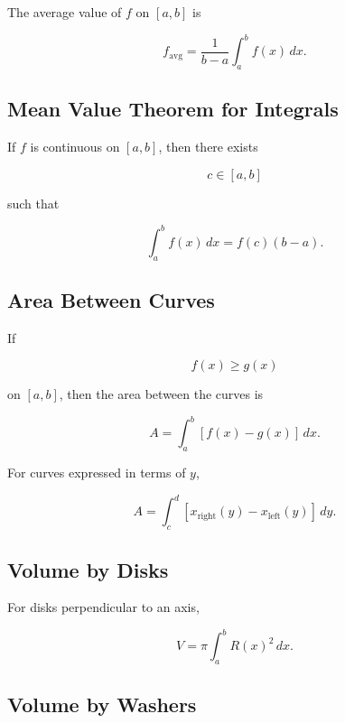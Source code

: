The average value of \(f\) on \([a,b]\) is

\[
\boxed{
f_{\mathrm{avg}}
=
\frac{
1
}{
b-a
}
\int_a^b
f(x)\,dx.
}
\]

\subsection{Mean Value Theorem for Integrals}
\label{subsec:mean-value-theorem-integral-reference}

If \(f\) is continuous on \([a,b]\), then there exists

\[
c\in[a,b]
\]

such that

\[
\boxed{
\int_a^b f(x)\,dx
=
f(c)(b-a).
}
\]

\subsection{Area Between Curves}
\label{subsec:area-between-curves-integral}

If

\[
f(x)\geq g(x)
\]

on \([a,b]\), then the area between the curves is

\[
\boxed{
A
=
\int_a^b
[f(x)-g(x)]
\,dx.
}
\]

For curves expressed in terms of \(y\),

\[
\boxed{
A
=
\int_c^d
[x_{\mathrm{right}}(y)-x_{\mathrm{left}}(y)]
\,dy.
}
\]

\subsection{Volume by Disks}
\label{subsec:disk-method-integral-reference}

For disks perpendicular to an axis,

\[
\boxed{
V
=
\pi
\int_a^b
R(x)^2
\,dx.
}
\]

\subsection{Volume by Washers}
\label{subsec:washer-method-integral-reference}

